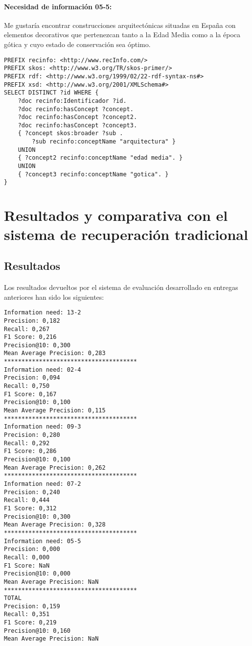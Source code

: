 \documentclass[a4paper]{article}
\begin{document}
\paragraph{Necesidad de información 05-5:}Me gustaría encontrar construcciones arquitectónicas situadas en España con elementos decorativos que pertenezcan tanto a la Edad Media como a la época gótica y cuyo estado de conservación sea óptimo.
\begin{lstlisting}[captionpos=b, caption=Consulta SPARQL para la necesidad de información 05-5, label=lst:sparql,
basicstyle=\ttfamily,frame=single]
PREFIX recinfo: <http://www.recInfo.com/>
PREFIX skos: <http://www.w3.org/TR/skos-primer/>
PREFIX rdf: <http://www.w3.org/1999/02/22-rdf-syntax-ns#>
PREFIX xsd: <http://www.w3.org/2001/XMLSchema#>
SELECT DISTINCT ?id WHERE {
	?doc recinfo:Identificador ?id.
	?doc recinfo:hasConcept ?concept.
	?doc recinfo:hasConcept ?concept2.
	?doc recinfo:hasConcept ?concept3.
	{ ?concept skos:broader ?sub . 
		?sub recinfo:conceptName "arquitectura" }
	UNION
	{ ?concept2 recinfo:conceptName "edad media". }
	UNION
	{ ?concept3 recinfo:conceptName "gotica". }
}
\end{lstlisting}
\newpage
\section{Resultados y comparativa con el sistema de recuperación tradicional}
\subsection{Resultados}
\paragraph{}Los resultados devueltos por el sistema de evaluación desarrollado en entregas anteriores han sido los siguientes:
\begin{lstlisting}[captionpos=b, caption=Resultados,
basicstyle=\ttfamily,frame=single]
Information need: 13-2
Precision: 0,182
Recall: 0,267
F1 Score: 0,216
Precision@10: 0,300
Mean Average Precision: 0,283
**************************************
Information need: 02-4
Precision: 0,094
Recall: 0,750
F1 Score: 0,167
Precision@10: 0,100
Mean Average Precision: 0,115
**************************************
Information need: 09-3
Precision: 0,280
Recall: 0,292
F1 Score: 0,286
Precision@10: 0,100
Mean Average Precision: 0,262
**************************************
Information need: 07-2
Precision: 0,240
Recall: 0,444
F1 Score: 0,312
Precision@10: 0,300
Mean Average Precision: 0,328
**************************************
Information need: 05-5
Precision: 0,000
Recall: 0,000
F1 Score: NaN
Precision@10: 0,000
Mean Average Precision: NaN
**************************************
TOTAL
Precision: 0,159
Recall: 0,351
F1 Score: 0,219
Precision@10: 0,160
Mean Average Precision: NaN
\end{lstlisting}
\newpage
\end{document}
